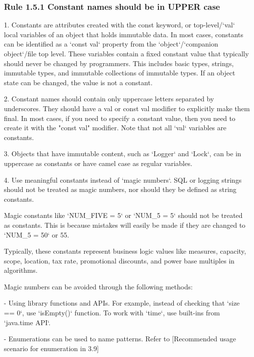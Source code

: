 \subsubsection*{\textbf{Rule 1.5.1 Constant names should be in UPPER case}}
\leavevmode\newline



1.	Constants are attributes created with the const keyword, or top-level/`val` local variables of an object that holds immutable data. In most cases, constants can be identified as a `const val` property from the `object`/`companion object`/file top level. These variables contain a fixed constant value that typically should never be changed by programmers. This includes basic types, strings, immutable types, and immutable collections of immutable types. If an object state can be changed, the value is not a constant.



2. Constant names should contain only uppercase letters separated by underscores. They should have a val or const val modifier to explicitly make them final. In most cases, if you need to specify a constant value, then you need to create it with the "const val" modifier. Note that not all `val` variables are constants.



3. Objects that have immutable content, such as `Logger` and `Lock`, can be in uppercase as constants or have camel case as regular variables.



4. Use meaningful constants instead of `magic numbers`. SQL or logging strings should not be treated as magic numbers, nor should they be defined as string constants.

Magic constants like `NUM_FIVE = 5` or `NUM_5 = 5` should not be treated as constants. This is because mistakes will easily be made if they are changed to `NUM_5 = 50` or 55.

Typically, these constants represent business logic values like measures, capacity, scope, location, tax rate, promotional discounts, and power base multiples in algorithms. 

Magic numbers can be avoided through the following methods:

- Using library functions and APIs. For example, instead of checking that `size == 0`, use `isEmpty()` function. To work with `time`, use built-ins from `java.time API`.

- Enumerations can be used to name patterns. Refer to [Recommended usage scenario for enumeration in 3.9]



